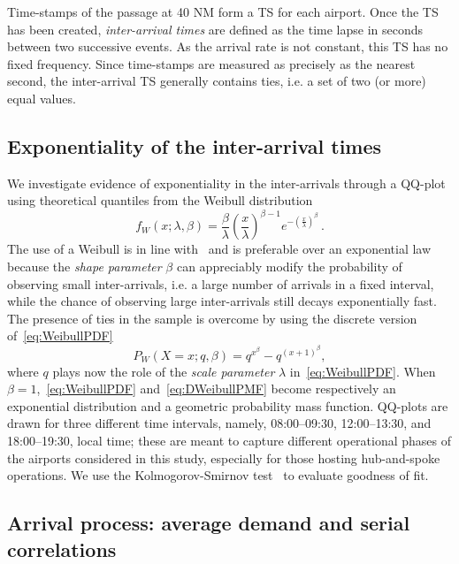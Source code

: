 \documentclass[draft,review]{elsarticle}
\makeatletter
\newcommand*{\ie}{i.e.\@\xspace}
\makeatother
\begin{document}
Time-stamps of the passage at 40 NM form a \ac{TS} for each airport.
Once the \ac{TS} has been created, \emph{inter-arrival times} are defined as the time lapse in seconds between two successive events. As the arrival rate is not constant, this \ac{TS} has no fixed frequency.
Since time-stamps are measured as precisely as the nearest second, the inter-arrival \ac{TS} generally contains ties, \ie{} a set of two (or more) equal values.

\subsection{Exponentiality of the inter-arrival times}\label{sec:dm_exp}

We investigate evidence of exponentiality in the inter-arrivals through a QQ-plot using theoretical quantiles from the Weibull distribution
\begin{equation}
    f_W(x; \lambda, \beta) = \frac{\beta}{\lambda} \left(\frac{x}{\lambda}\right)^{\beta-1} e^{-(\frac{x}{\lambda})^\beta} \,.
    \label{eq:WeibullPDF}
\end{equation}
The use of a Weibull is in line with~\citet{willemain2004statistical} and is preferable over an exponential law because the \emph{shape parameter} \(\beta\) can appreciably modify the probability of observing small inter-arrivals, \ie{} a large number of arrivals in a fixed interval, while the chance of observing large inter-arrivals still decays exponentially fast.
The presence of ties in the sample is overcome by using the discrete version of~\eqref{eq:WeibullPDF}~\citep{nakagawa1975discrete,barbiero2013discrete}
\begin{equation}
    P_W(X=x;q,\beta) = q^{x^\beta} - q^{(x+1)^\beta},
    \label{eq:DWeibullPMF}
\end{equation}
where \(q\) plays now the role of the \emph{scale parameter} \(\lambda\) in~\eqref{eq:WeibullPDF}.
When \(\beta = 1\),~\eqref{eq:WeibullPDF} and~\eqref{eq:DWeibullPMF} become respectively an exponential distribution and a geometric probability mass function.
QQ-plots are drawn for three different time intervals, namely, 08:00--09:30, 12:00--13:30, and 18:00--19:30, local time; these are meant to capture different operational phases of the airports considered in this study, especially for those hosting hub-and-spoke operations.
We use the Kolmogorov-Smirnov test~\citep{taylor2011nonparam} to evaluate goodness of fit.

\subsection{Arrival process: average demand and serial correlations}\label{sec:dm_serial_corr}
\end{document}
